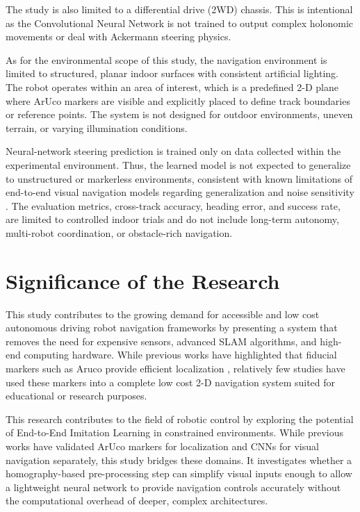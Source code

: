 The study is also limited to a differential drive (2WD) chassis. This is intentional as the Convolutional Neural Network is not trained to output complex holonomic movements or deal with Ackermann steering physics.

As for the environmental scope of this study, the navigation environment is limited to structured, planar indoor surfaces with consistent artificial lighting. The robot operates within an area of interest, which is a predefined 2-D plane where ArUco markers are visible and explicitly placed to define track boundaries or reference points. The system is not designed for outdoor environments, uneven terrain, or varying illumination conditions.

Neural-network steering prediction is trained only on data collected within the experimental environment. Thus, the learned model is not expected to generalize to unstructured or markerless environments, consistent with known limitations of end-to-end visual navigation models regarding generalization and noise sensitivity \cite{Bansal2020ChauffeurNet, Codevilla2019BehaviorCloningLimits}. The evaluation metrics, cross-track accuracy, heading error, and success rate, are limited to controlled indoor trials and do not include long-term autonomy, multi-robot coordination, or obstacle-rich navigation.

\section{Significance of the Research } 
This study contributes to the growing demand for accessible and low cost autonomous driving robot navigation frameworks by presenting a system that removes the need for expensive sensors, advanced SLAM algorithms, and high-end computing hardware. While previous works have highlighted that fiducial markers such as Aruco provide efficient localization \cite{GarridoJurado2014FiducialMarkers, RomeroRamirez2018SpeededFiducialDetection}, relatively few studies have used these markers into a complete low cost 2-D navigation system suited for educational or research purposes.

This research contributes to the field of robotic control by exploring the potential of End-to-End Imitation Learning in constrained environments. While previous works have validated ArUco markers for localization \cite{RomeroRamirez2018SpeededFiducialDetection} and CNNs for visual navigation separately, this study bridges these domains. It investigates whether a homography-based pre-processing step can simplify visual inputs enough to allow a lightweight neural network to provide navigation controls accurately without the computational overhead of deeper, complex architectures.

